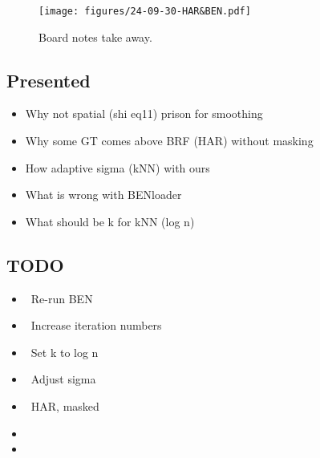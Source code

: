 
\begin{figure}[htbp]
    \centering
    \texttt{[image: figures/24-09-30-HAR\&BEN.pdf]}
    \caption{Board notes take away.}
    \label{fig:24-09-30-HAR&BEN}
\end{figure}

\begin{multicols}{2}
\subsection*{Presented}
\begin{itemize}
    \item Why not spatial (shi eq11) prison for smoothing 
    \item Why some GT comes above BRF (HAR) without masking
    \item How adaptive sigma (kNN) with ours
    \item What is wrong with BENloader
    \item What should be k for kNN (log n)
\end{itemize}

\subsection*{TODO}
\begin{itemize}
    \item \checkmark \ Re-run BEN
    \item \checkmark \ Increase iteration numbers
    \item \checkmark \ Set k to log n
    \item \checkmark \ Adjust sigma
    \item \checkmark \ HAR, masked
    \item {}
    \item {}
\end{itemize}
\end{multicols}

\newpage



